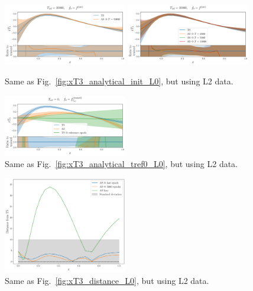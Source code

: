 \begin{figure}[h]
    \centering
    \includegraphics[width=0.48\textwidth]{plots/pdf_plot_init_last_epoch_L2.pdf}
    \includegraphics[width=0.48\textwidth]{plots/pdf_plot_init_epochs_L2.pdf}
    \caption{Same as Fig.~\ref{fig:xT3_analytical_init_L0}, but using L2 data.}
    \label{fig:xT3_analytical_init_L2}
  \end{figure}
  \begin{figure}[h]
    \centering
    \includegraphics[width=0.48\textwidth]{plots/pdf_plot_ref_0_L2.pdf}
    \caption{Same as Fig.~\ref{fig:xT3_analytical_tref0_L0}, but using L2 data.}
    \label{fig:xT3_analytical_tref0_L2}
  \end{figure}
  \begin{figure}[h]
    \centering
    \includegraphics[width=0.48\textwidth]{plots/distance_plot_L2.pdf}
    \caption{Same as Fig.~\ref{fig:xT3_distance_L0}, but using L2 data.}
    \label{fig:xT3_distance_L2}
  \end{figure}


